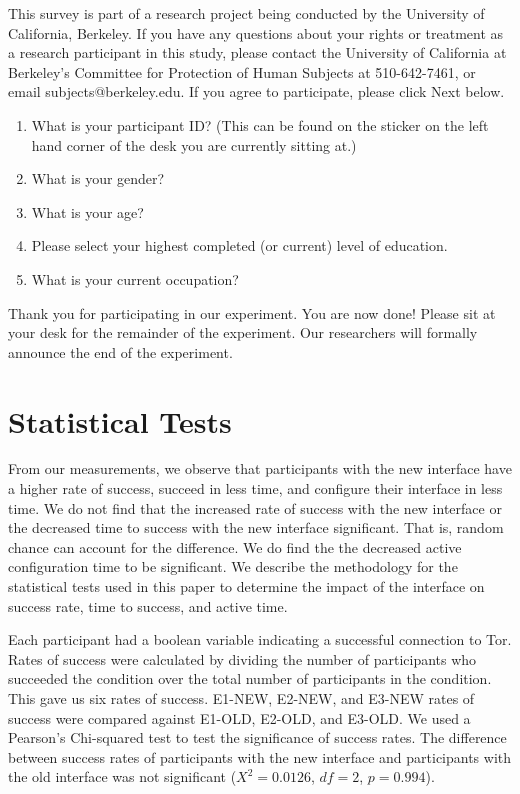 \documentclass[USenglish,oneside,twocolumn]{article}
\begin{document}
This survey is part of a research project being conducted by the University of California, Berkeley. If you have any questions about your rights or treatment as a research participant in this study, please contact the University of California at Berkeley's Committee for Protection of Human Subjects at 510-642-7461, or email subjects@berkeley.edu. If you agree to participate, please click Next below.\\

\begin{enumerate}
\item{What is your participant ID? (This can be found on the sticker on the left hand corner of the desk you are currently sitting at.)}
\item{What is your gender?}
\item{What is your age?}
\item{Please select your highest completed (or current) level of education}.
\item{What is your current occupation?}  
\end{enumerate}

Thank you for participating in our experiment. You are now done! Please sit at your desk for the remainder of the experiment. Our researchers will formally announce the end of the experiment. 

\section{Statistical Tests} 
From our measurements, we observe that participants with the new interface 
have a higher rate of success, succeed in less time, and configure their interface in less time. 
We do not find that the increased rate of success with the new interface or the decreased time to success with the new interface significant. That is, random chance can account for the difference. 
We do find the the decreased active configuration time to be significant. 
We describe the methodology for the statistical tests used in this paper to determine the impact of the interface on success rate, time to success, and active time. 

Each participant had a boolean variable indicating a successful connection to Tor. Rates of success were calculated by dividing the number of participants who succeeded the condition over the total number of participants in the condition. This gave us six rates of success. E1-NEW, E2-NEW, and E3-NEW rates of success were compared against E1-OLD, E2-OLD, and E3-OLD.  We used a Pearson's Chi-squared test to test the significance of success rates. The difference between success rates of participants with the new interface and participants with the old interface was not significant ($X^2 = 0.0126$, $df = 2$, $p = 0.994$).
\end{document}
